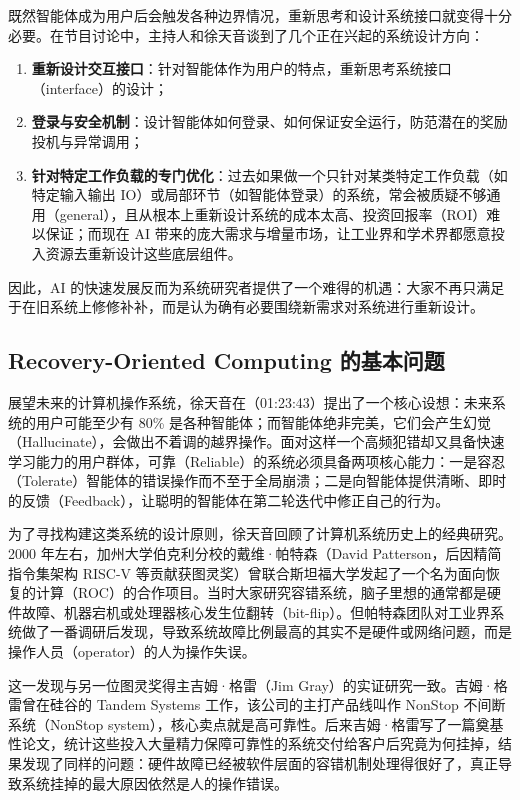 \documentclass[UTF8,a4paper,11pt,fontset=fandol]{ctexart}
\begin{document}
既然智能体成为用户后会触发各种边界情况，重新思考和设计系统接口就变得十分必要。在节目讨论中，主持人和徐天音谈到了几个正在兴起的系统设计方向：
\begin{enumerate}
\item \textbf{重新设计交互接口}：针对智能体作为用户的特点，重新思考系统接口（interface）的设计；
\item \textbf{登录与安全机制}：设计智能体如何登录、如何保证安全运行，防范潜在的奖励投机与异常调用；
\item \textbf{针对特定工作负载的专门优化}：过去如果做一个只针对某类特定工作负载（如特定输入输出 IO）或局部环节（如智能体登录）的系统，常会被质疑不够通用（general），且从根本上重新设计系统的成本太高、投资回报率（ROI）难以保证；而现在 AI 带来的庞大需求与增量市场，让工业界和学术界都愿意投入资源去重新设计这些底层组件。
\end{enumerate}

因此，AI 的快速发展反而为系统研究者提供了一个难得的机遇：大家不再只满足于在旧系统上修修补补，而是认为确有必要围绕新需求对系统进行重新设计。

\subsection{Recovery-Oriented Computing 的基本问题}
展望未来的计算机操作系统，徐天音在（01:23:43）提出了一个核心设想：未来系统的用户可能至少有 80\% 是各种智能体；而智能体绝非完美，它们会产生幻觉（Hallucinate），会做出不着调的越界操作。面对这样一个高频犯错却又具备快速学习能力的用户群体，可靠（Reliable）的系统必须具备两项核心能力：一是容忍（Tolerate）智能体的错误操作而不至于全局崩溃；二是向智能体提供清晰、即时的反馈（Feedback），让聪明的智能体在第二轮迭代中修正自己的行为。

为了寻找构建这类系统的设计原则，徐天音回顾了计算机系统历史上的经典研究。2000 年左右，加州大学伯克利分校的戴维·帕特森（David Patterson，后因精简指令集架构 RISC-V 等贡献获图灵奖）曾联合斯坦福大学发起了一个名为面向恢复的计算（ROC）的合作项目。当时大家研究容错系统，脑子里想的通常都是硬件故障、机器宕机或处理器核心发生位翻转（bit-flip）。但帕特森团队对工业界系统做了一番调研后发现，导致系统故障比例最高的其实不是硬件或网络问题，而是操作人员（operator）的人为操作失误。

这一发现与另一位图灵奖得主吉姆·格雷（Jim Gray）的实证研究一致。吉姆·格雷曾在硅谷的 Tandem Systems 工作，该公司的主打产品线叫作 NonStop 不间断系统（NonStop system），核心卖点就是高可靠性。后来吉姆·格雷写了一篇奠基性论文，统计这些投入大量精力保障可靠性的系统交付给客户后究竟为何挂掉，结果发现了同样的问题：硬件故障已经被软件层面的容错机制处理得很好了，真正导致系统挂掉的最大原因依然是人的操作错误。
\end{document}
